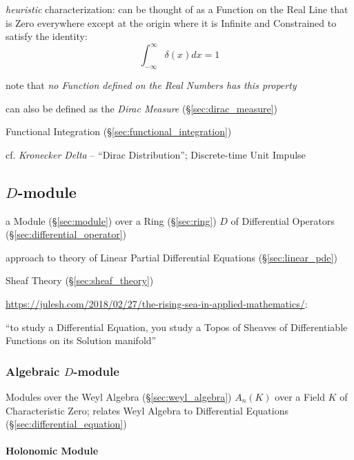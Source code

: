 \emph{heuristic} characterization: can be thought of as a Function on the Real
Line that is Zero everywhere except at the origin where it is Infinite and
Constrained to satisfy the identity:
\[
  \int_{-\infty}^\infty \delta(x) dx = 1
\]

note that \emph{no Function defined on the Real Numbers has this property}

can also be defined as the \emph{Dirac Measure} (\S\ref{sec:dirac_measure})

\fist Functional Integration (\S\ref{sec:functional_integration})

cf. \emph{Kronecker Delta} -- ``Dirac Distribution''; Discrete-time Unit Impulse



\subsection{$D$-module}\label{sec:d_module}

a Module (\S\ref{sec:module}) over a Ring (\S\ref{sec:ring}) $D$ of Differential
Operators (\S\ref{sec:differential_operator})

approach to theory of Linear Partial Differential Equations
(\S\ref{sec:linear_pde})

Sheaf Theory (\S\ref{sec:sheaf_theory})

\url{https://julesh.com/2018/02/27/the-rising-sea-in-applied-mathematics/}:

``to study a Differential Equation, you study a Topos of Sheaves of
Differentiable Functions on its Solution manifold''



\subsubsection{Algebraic $D$-module}\label{sec:algebraic_d_module}

Modules over the Weyl Algebra (\S\ref{sec:weyl_algebra}) $A_n(K)$ over a Field
$K$ of Characteristic Zero; relates Weyl Algebra to Differential Equations
(\S\ref{sec:differential_equation})



\paragraph{Holonomic Module}\label{sec:holonomic_module}\hfill

